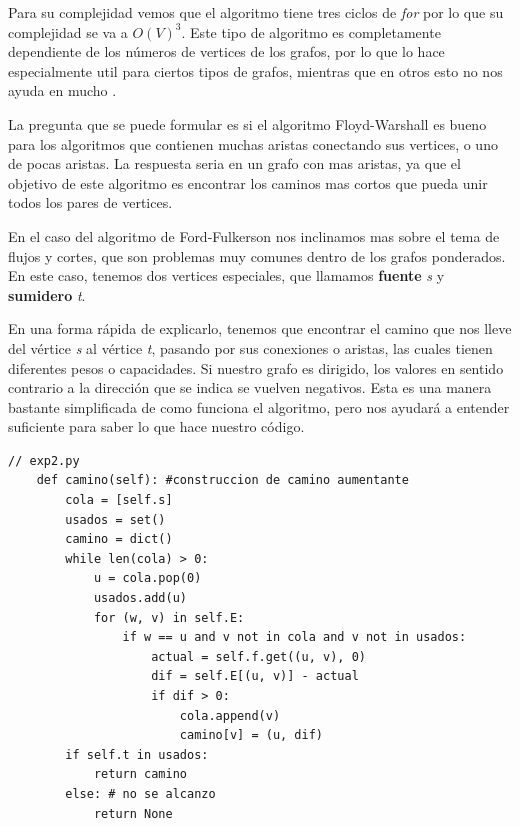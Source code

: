 \documentclass{article}%
\begin{document}
Para su complejidad vemos que el algoritmo tiene tres ciclos de \textit{for} por lo que su complejidad se va a $O(V)^3$. Este tipo de algoritmo es completamente dependiente de los n\'umeros de vertices de los grafos, por lo que lo hace especialmente util para ciertos tipos de grafos, mientras que en otros esto no nos ayuda en mucho \cite{floyd2}.


La pregunta que se puede formular es si el algoritmo Floyd-Warshall es bueno para los algoritmos que contienen muchas aristas conectando sus vertices, o uno de pocas aristas. La respuesta seria en un grafo con mas aristas, ya que el objetivo de este algoritmo es encontrar los caminos mas cortos que pueda unir todos los pares de vertices\cite{floyd1}. 


\begin{description}[font=$\bullet$~\normalfont\scshape\color{black}] 
\item[\textbf{Ford Fulkerson} ]

\end{description}

En el caso del algoritmo de Ford-Fulkerson nos inclinamos mas sobre el tema de flujos y cortes, que son problemas muy comunes dentro de los grafos ponderados. En este caso, tenemos dos vertices especiales, que llamamos \textbf{fuente} \textit{s} y \textbf{sumidero} \textit{t}. \cite{elisa}


En una forma r\'apida de explicarlo, tenemos que encontrar el camino que nos lleve del v\'ertice \textit{s} al v\'ertice \textit{t}, pasando por sus conexiones o aristas, las cuales tienen diferentes pesos o capacidades. Si nuestro grafo es dirigido, los valores en sentido contrario a la direcci\'on que se indica se vuelven negativos\cite{ford}. Esta es una manera bastante simplificada de como funciona el algoritmo, pero nos ayudar\'a a entender suficiente para saber lo que hace nuestro c\'odigo.

\begin{lstlisting}
// exp2.py
	def camino(self): #construccion de camino aumentante
		cola = [self.s]
		usados = set()
		camino = dict()
		while len(cola) > 0:
			u = cola.pop(0)
			usados.add(u)
			for (w, v) in self.E:
				if w == u and v not in cola and v not in usados:
					actual = self.f.get((u, v), 0)
					dif = self.E[(u, v)] - actual
					if dif > 0:
						cola.append(v)
						camino[v] = (u, dif)
		if self.t in usados:
			return camino
		else: # no se alcanzo
			return None	
\end{lstlisting}
\end{document}
